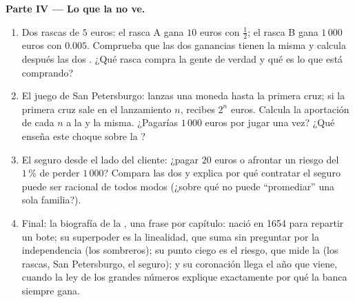 \begin{problem}
\medskip
\noindent\textbf{Parte IV --- Lo que la  no ve.}
\begin{enumerate}[resume]
  \item Dos rascas de $5$ euros: el rasca A gana $10$ euros con
         $\frac12$; el rasca B gana $1\,000$ euros con
         $0.005$. Comprueba que las dos ganancias tienen la
        misma  y calcula después las dos . ¿Qué rasca
        compra la gente de verdad y qué es lo que está comprando?
  \item El juego de San Petersburgo: lanzas una moneda hasta la primera
        cruz; si la primera cruz sale en el lanzamiento $n$, recibes $2^n$
        euros. Calcula la aportación de cada $n$ a la  y la
         misma. ¿Pagarías $1\,000$ euros por jugar una vez? ¿Qué
        enseña este choque sobre la ?
  \item El seguro desde el lado del cliente: ¿pagar $20$ euros o afrontar
        un riesgo del $1\,\%$ de perder $1\,000$? Compara las dos
         y explica por qué contratar el seguro puede ser
        racional de todos modos (¿sobre qué no puede ``promediar'' una
        sola familia?).
  \item Final: la biografía de la , una frase por capítulo: nació
        en 1654 para repartir un bote; su superpoder es la linealidad, que
        suma  sin preguntar por la independencia (los
        sombreros); su punto ciego es el riesgo, que mide la  (los
        rascas, San Petersburgo, el seguro); y su coronación llega el año
        que viene, cuando la ley de los grandes números explique
        exactamente por qué la banca siempre gana.
\end{enumerate}
\end{problem}
